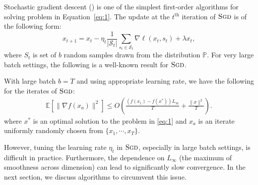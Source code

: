 Stochastic gradient descent (\sgd) is one of the simplest first-order algorithms for solving problem in Equation~\ref{eq:1}. The update at the $t^{\text{th}}$ iteration of $\textsc{Sgd}$ is of the following form:
\begin{equation}
\tag{$\sgd$}
x_{t+1} = x_{t} - \eta_t  \frac{1}{|\mathcal{S}_t|} \sum_{s_t \in \mathcal{S}_t} \nabla \ell(x_t, s_t) + \lambda x_t,
\end{equation}
where $S_t$ is set of $b$ random samples drawn from the  distribution $\mathbb{P}$. For very large batch settings, the following is a well-known result for $\textsc{Sgd}$.
\begin{theorem}
With large batch $b=T$ and using appropriate learning rate, we have the following for the iterates of $\textsc{Sgd}$:
\begin{align*}
\mathbb{E}\left[\|\nabla f(x_a)\|^2\right] \leq O\left(\frac{(f(x_1) - f(x^*))L_{\infty}}{T} + \frac{\|\sigma \|^2}{T}\right).
\end{align*}
where $x^*$ is an optimal solution to the problem in \eqref{eq:1} and $x_a$ is an iterate uniformly randomly chosen from $\{x_1, \cdots, x_T\}$.
\label{thm:sgd-conv}
\end{theorem}
However, tuning the learning rate $\eta_t$ in $\textsc{Sgd}$, especially in large batch settings, is difficult in practice. Furthermore, the dependence on $L_\infty$ (the maximum of smoothness across dimension) can lead to significantly slow convergence. In the next section, we discuss algorithms to circumvent this issue. 